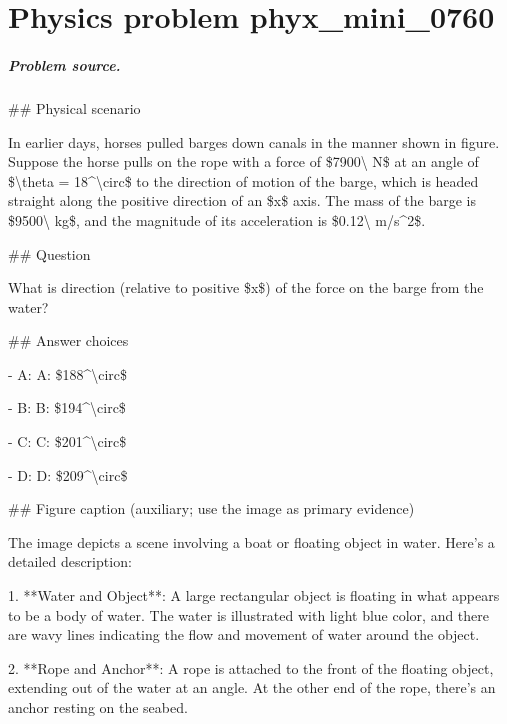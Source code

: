 
\chapter{Physics problem phyx\_mini\_0760}
\label{ch:PhyXMiniProblems_problem_phyx_mini_0760}

\paragraph{Problem source.}
\#\# Physical scenario

In earlier days, horses pulled barges down canals in the manner shown in figure. Suppose the horse pulls on the rope with a force of \$7900\textbackslash{} N\$ at an angle of \$\textbackslash{}theta = 18\textasciicircum{}\textbackslash{}circ\$ to the direction of motion of the barge, which is headed straight along the positive direction of an \$x\$ axis. The mass of the barge is \$9500\textbackslash{} kg\$, and the magnitude of its acceleration is \$0.12\textbackslash{} m/s\textasciicircum{}2\$.

\#\# Question

What is direction (relative to positive \$x\$) of the force on the barge from the water?

\#\# Answer choices

- A: A: \$188\textasciicircum{}\textbackslash{}circ\$

- B: B: \$194\textasciicircum{}\textbackslash{}circ\$

- C: C: \$201\textasciicircum{}\textbackslash{}circ\$

- D: D: \$209\textasciicircum{}\textbackslash{}circ\$

\#\# Figure caption (auxiliary; use the image as primary evidence)

The image depicts a scene involving a boat or floating object in water. Here's a detailed description:

1. **Water and Object**: A large rectangular object is floating in what appears to be a body of water. The water is illustrated with light blue color, and there are wavy lines indicating the flow and movement of water around the object.

2. **Rope and Anchor**: A rope is attached to the front of the floating object, extending out of the water at an angle. At the other end of the rope, there's an anchor resting on the seabed.

